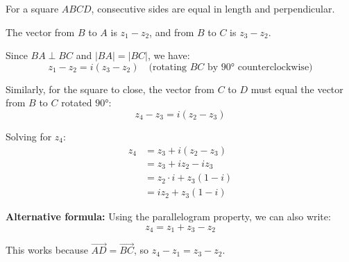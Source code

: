 \begin{solution}[Sketch]
For a square $ABCD$, consecutive sides are equal in length and perpendicular. 

The vector from $B$ to $A$ is $z_1 - z_2$, and from $B$ to $C$ is $z_3 - z_2$.

Since $BA \perp BC$ and $|BA| = |BC|$, we have:
\[
z_1 - z_2 = i(z_3 - z_2) \quad \text{(rotating $BC$ by $90°$ counterclockwise)}
\]

Similarly, for the square to close, the vector from $C$ to $D$ must equal the vector from $B$ to $C$ rotated $90°$:
\[
z_4 - z_3 = i(z_2 - z_3)
\]

Solving for $z_4$:
\begin{align*}
z_4 &= z_3 + i(z_2 - z_3)\\
&= z_3 + iz_2 - iz_3\\
&= z_2 \cdot i + z_3(1 - i)\\
&= iz_2 + z_3(1-i)
\end{align*}

\textbf{Alternative formula:} Using the parallelogram property, we can also write:
\[
z_4 = z_1 + z_3 - z_2
\]

This works because $\vec{AD} = \vec{BC}$, so $z_4 - z_1 = z_3 - z_2$.

\vspace{0.5em}
\begin{center}
\end{center}
\end{solution}
